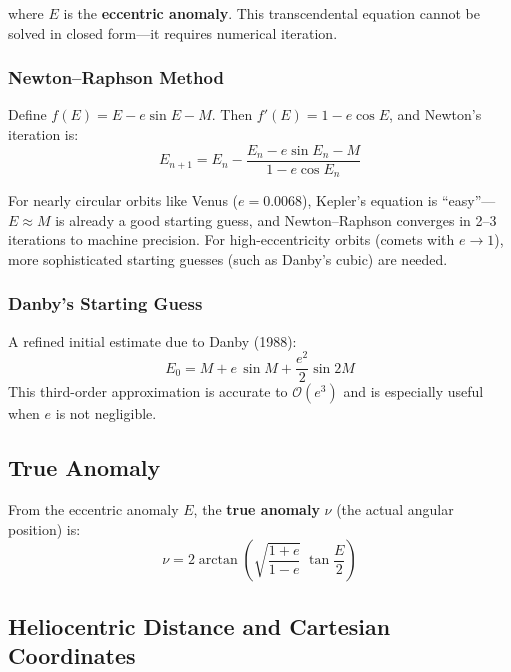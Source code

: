 \documentclass[11pt,letterpaper]{article}
\theoremstyle{definition}
\theoremstyle{plain}
\theoremstyle{remark}
\begin{document}
where $E$ is the \textbf{eccentric anomaly}. This transcendental
equation cannot be solved in closed form—it requires numerical
iteration.

\subsubsection{Newton–Raphson Method}

Define $f(E) = E - e\sin E - M$. Then $f'(E) = 1 - e\cos E$, and
Newton's iteration is:
\begin{equation}
  E_{n+1} = E_n - \frac{E_n - e\sin E_n - M}{1 - e\cos E_n}
  \label{eq:newton}
\end{equation}

\begin{physicsintuition}
For nearly circular orbits like Venus ($e = 0.0068$), Kepler's
equation is ``easy''—$E \approx M$ is already a good starting guess,
and Newton–Raphson converges in 2--3 iterations to machine precision.
For high-eccentricity orbits (comets with $e \to 1$), more
sophisticated starting guesses (such as Danby's cubic) are needed.
\end{physicsintuition}

\subsubsection{Danby's Starting Guess}

A refined initial estimate due to Danby (1988):
\begin{equation}
  E_0 = M + e\,\sin M + \frac{e^2}{2}\sin 2M
  \label{eq:danby}
\end{equation}
This third-order approximation is accurate to $\mathcal{O}(e^3)$ and
is especially useful when $e$ is not negligible.


\subsection{True Anomaly}

From the eccentric anomaly $E$, the \textbf{true anomaly} $\nu$
(the actual angular position) is:
\begin{equation}
  \nu = 2\arctan\!\left(
    \sqrt{\frac{1+e}{1-e}}\;\tan\frac{E}{2}
  \right)
  \label{eq:true_anomaly}
\end{equation}

\subsection{Heliocentric Distance and Cartesian Coordinates}
\end{document}
